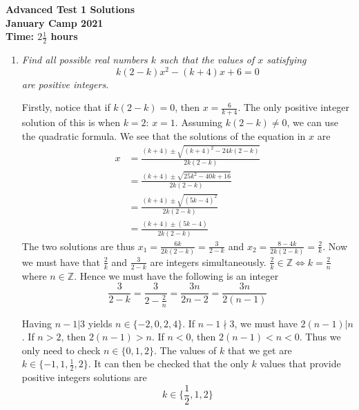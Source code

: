 \documentclass{article}
\begin{document}
\thispagestyle{empty}

\begin{center}
  \textbf{\Large Advanced Test 1 Solutions}
  \\ \vspace{1em}
  \textbf{\large January Camp 2021}
  \\ \vspace{1em}
  \textbf{\large Time: $2\frac{1}{2}$ hours}
\end{center}

\vspace{24pt}

\begin{enumerate}[1.]

\item %
{\itshape Find all possible real numbers $k$ such that the values of $x$ satisfying
$$k(2 - k)x^2 - (k + 4)x + 6 = 0$$
are positive integers.}

Firstly, notice that if $k(2 - k) = 0$, then $x = \frac{6}{k + 4}$. The only positive integer solution of this is when $k = 2$: $x = 1$.
Assuming $k(2 - k) \ne 0$, we can use the quadratic formula. We see that the solutions of the equation in $x$ are
\begin{align*}
    x &= \frac{(k + 4) \pm \sqrt{(k + 4)^2 - 24k(2 - k)}}{2k(2 - k)} \\
    &= \frac{(k + 4) \pm \sqrt{25k^2 - 40k + 16}}{2k(2 - k)} \\
    &= \frac{(k + 4) \pm \sqrt{(5k - 4)^2}}{2k(2 - k)} \\
    &= \frac{(k + 4) \pm (5k - 4)}{2k(2 - k)}
\end{align*}
The two solutions are thus $x_1 = \frac{6k}{2k(2 - k)} = \frac{3}{2 - k}$ and $x_2 = \frac{8 - 4k}{2k(2 - k)} = \frac{2}{k}$. Now we must have that $\frac{2}{k}$ and $\frac{3}{2 - k}$ are integers simultaneously. $\frac{2}{k} \in \mathbb{Z} \iff k = \frac{2}{n}$ where $n \in \mathbb{Z}$. Hence we must have the following is an integer 
$$\frac{3}{2 - k} = \frac{3}{2 - \frac{2}{n}} = \frac{3n}{2n - 2}= \frac{3n}{2(n - 1)}$$

Having $n - 1 | 3$ yields $n \in \{-2, 0, 2, 4\}$. If $n - 1 \nmid 3$, we must have $2(n - 1) | n$. If $n > 2$, then $2(n - 1) > n$. If $n < 0$, then $2(n - 1) < n < 0$. Thus we only need to check $n \in \{0, 1, 2\}$. The values of $k$ that we get are $k \in \{-1, 1, \frac{1}{2}, 2\}$. It can then be checked that the only $k$ values that provide positive integers solutions are 
$$k \in \{\frac{1}{2}, 1, 2\}$$


\end{enumerate}
\end{document}
